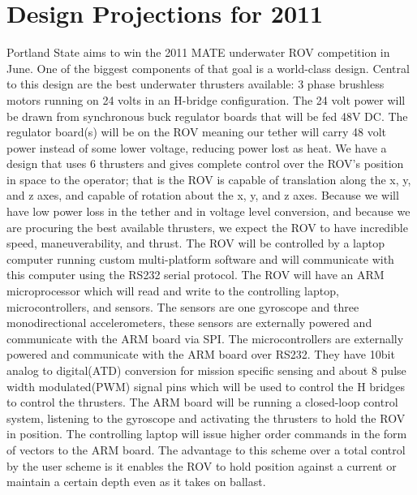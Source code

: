 \documentclass{proposalnsf}
\begin{document}
\section{Design Projections for 2011}
Portland State aims to win the 2011 MATE underwater ROV competition in June. One of the biggest components of that goal is a world-class design. Central 
to this design are the best underwater thrusters available: 3 phase brushless motors running on 24 volts in an H-bridge configuration. The 24 volt power 
will be drawn from synchronous buck regulator boards that will be fed 48V DC. The regulator board(s) will be on the ROV meaning our tether will carry 48 
volt power instead of some lower voltage, reducing power lost as heat. We have a design that uses 6 thrusters and gives complete control over the ROV’s 
position in space to the operator; that is the ROV is capable of translation along the x, y, and z axes, and capable of rotation about the x, y, and z axes. 
Because we will have low power loss in the tether and in voltage level conversion, and because we are procuring the best available thrusters, we expect the 
ROV to have incredible speed, maneuverability, and thrust. The ROV will be controlled by a laptop computer running custom multi-platform software and will 
communicate with this computer using the RS232 serial protocol. The ROV will have an ARM microprocessor which will read and write to the controlling laptop, 
microcontrollers, and sensors. The sensors are one gyroscope and three monodirectional accelerometers, these sensors are externally powered and communicate 
with the ARM board via SPI. The microcontrollers are externally powered and communicate with the ARM board over RS232. They have 10bit analog to digital(ATD) 
conversion for mission specific sensing and about 8 pulse width modulated(PWM) signal pins which will be used to control the H bridges to control the thrusters. 
The ARM board will be running a closed-loop control system, listening to the gyroscope and activating the thrusters to hold the ROV in position. The 
controlling laptop will issue higher order commands in the form of vectors to the ARM board. The advantage to this scheme over a total control by the user 
scheme is it enables the ROV to hold position against a current or maintain a certain depth even as it takes on ballast.


\newpage
{}
\renewcommand{\thepage} {E--\arabic{page}}



\end{document}
